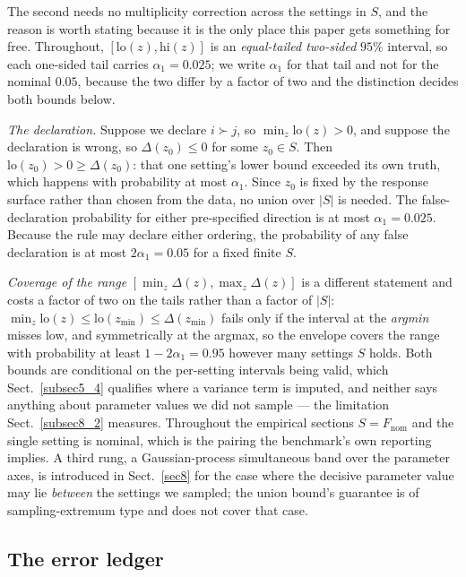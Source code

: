 \documentclass[pdflatex,iicol,sn-apa]{sn-jnl}
\theoremstyle{remark}
\begin{document}
\noindent The second needs no multiplicity correction across the settings in $S$, and the reason is
worth stating because it is the only place this paper gets something for free. Throughout,
$[\mathrm{lo}(z), \mathrm{hi}(z)]$ is an \emph{equal-tailed two-sided} $95\%$ interval, so each
one-sided tail carries $\alpha_1 = 0.025$; we write $\alpha_1$ for that tail and not for the nominal
$0.05$, because the two differ by a factor of two and the distinction decides both bounds below.

\emph{The declaration.} Suppose we declare $i \succ j$, so $\min_z \mathrm{lo}(z) > 0$, and suppose
the declaration is wrong, so $\Delta(z_0) \le 0$ for some $z_0 \in S$. Then
$\mathrm{lo}(z_0) > 0 \ge \Delta(z_0)$: that one setting's lower bound exceeded its own truth, which
happens with probability at most $\alpha_1$. Since $z_0$ is fixed by the response surface rather
than chosen from the data, no union over $|S|$ is needed. The false-declaration probability for either
pre-specified direction is at most $\alpha_1 = 0.025$. Because the rule may declare either ordering,
the probability of any false declaration is at most $2\alpha_1 = 0.05$ for a fixed finite $S$.

\emph{Coverage of the range} $[\min_z \Delta(z), \max_z \Delta(z)]$ is a different statement and
costs a factor of two on the tails rather than a factor of $|S|$:
$\min_z \mathrm{lo}(z) \le \mathrm{lo}(z_{\min}) \le \Delta(z_{\min})$ fails only if the interval at
the \emph{argmin} misses low, and symmetrically at the argmax, so the envelope covers the range with
probability at least $1 - 2\alpha_1 = 0.95$ however many settings $S$ holds. Both bounds are
conditional on the per-setting intervals being valid, which Sect.~\ref{subsec5_4} qualifies where a
variance term is imputed, and neither says anything about parameter values we did not sample --- the
limitation Sect.~\ref{subsec8_2} measures.
Throughout the empirical sections $S = F_{\mathrm{nom}}$ and the single setting is nominal, which is
the pairing the benchmark's own reporting implies.
A third rung, a Gaussian-process simultaneous band over the parameter axes, is introduced in
Sect.~\ref{sec8} for the case where the decisive parameter value may lie \emph{between} the settings
we sampled; the union bound's guarantee is of sampling-extremum type and does not cover that case.

\subsection{The error ledger}\label{subsec3_4}
\end{document}
